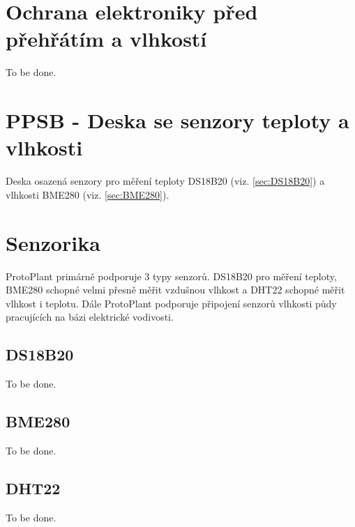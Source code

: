 \section{Ochrana elektroniky před přehřátím a vlhkostí}
To be done.

\section{PPSB - Deska se senzory teploty a vlhkosti}
Deska osazená senzory pro měření teploty DS18B20 (viz. \autoref{sec:DS18B20}) a vlhkosti BME280 (viz. \autoref{sec:BME280}). 

\section{Senzorika}
ProtoPlant primárně podporuje 3 typy senzorů. 
DS18B20 pro měření teploty, BME280 schopné velmi přesně měřit vzdušnou vlhkost a DHT22 schopné měřit vlhkost i teplotu.
Dále ProtoPlant podporuje připojení senzorů vlhkosti půdy pracujících na bázi elektrické vodivosti.

\subsection{DS18B20}
\label{sec:DS18B20}
To be done.

\subsection{BME280}
\label{sec:BME280}
To be done.

\subsection{DHT22}
\label{sec:DHT22}
To be done.

\newpage